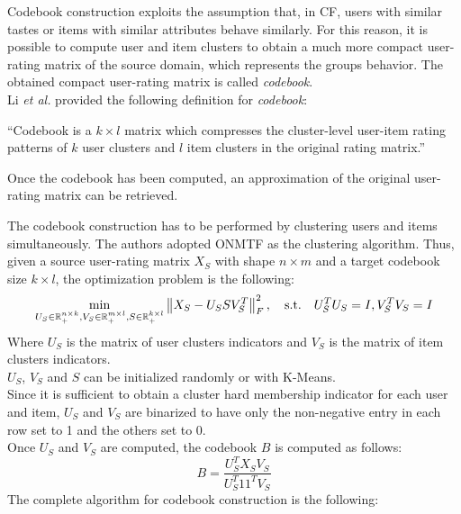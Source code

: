 Codebook construction exploits the assumption that, in CF, users with similar tastes or items with similar attributes behave similarly. For this reason, it is possible to compute user and item clusters to obtain a much more compact user-rating matrix of the source domain, which represents the groups behavior. The obtained compact user-rating matrix is called \textit{codebook}.\\
Li \textit{et al.} provided the following definition for \textit{codebook}:
\begin{displayquote}
\enquote{Codebook is a $k \times l$ matrix which compresses the cluster-level user-item rating patterns of $k$ user clusters and $l$ item clusters in the original rating matrix.}
\end{displayquote}
Once the codebook has been computed, an approximation of the original user-rating matrix can be retrieved.\par
The codebook construction has to be performed by clustering users and items simultaneously. The authors adopted ONMTF \cite{10.1145/1150402.1150420} as the clustering algorithm. Thus, given a source user-rating matrix $X_S$ with shape $n \times m$ and a target codebook size $k \times l$, the optimization problem is the following:
\begin{equation}
\min_{U_S \in \mathbb{R}^{n \times k}_+, V_S \in \mathbb{R}^{m \times l}_+, S \in \mathbb{R}^{k \times l}_+} \left\lVert X_S - U_S S V_S^T\right\rVert_F^2, \quad \text{s.t.} \quad U_S^T U_S = I, V_S^T V_S = I
\end{equation}
Where $U_S$ is the matrix of user clusters indicators and $V_S$ is the matrix of item clusters indicators.\\
$U_S$, $V_S$ and $S$ can be initialized randomly or with K-Means.\\
Since it is sufficient to obtain a cluster hard membership indicator for each user and item, $U_S$ and $V_S$ are binarized to have only the non-negative entry in each row set to 1 and the others set to 0.\\
Once $U_S$ and $V_S$ are computed, the codebook $B$ is computed as follows:
\begin{equation}
\label{eq:codebook-construction}
B = \frac{U_S^T X_S V_S}{U_S^T 11^T V_S}
\end{equation}
The complete algorithm for codebook construction is the following:
\vskip 0.7cm
